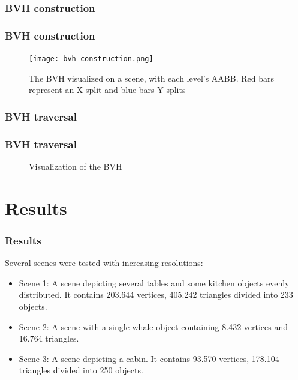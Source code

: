 \documentclass{beamer}
\newenvironment{figure*}%
{\begin{figure}}
{\end{figure}}
\begin{document}
\subsubsection{BVH construction}
\begin{frame}
  \frametitle{BVH construction}
\begin{figure}
\centering
\texttt{[image: bvh-construction.png]}
\caption{The BVH visualized on a scene, with each level's AABB. Red
  bars represent an X split and blue bars Y splits}
\label{fig:bvh-construction}
\end{figure}

\end{frame}


\subsubsection{BVH traversal}
\begin{frame}
  \frametitle{BVH traversal}
\begin{figure}
\centering


\caption{Visualization of the BVH}
\label{fig:bvh}
\end{figure}

\end{frame}



\section{Results}
\begin{frame}
  \frametitle{Results}

Several scenes were tested with increasing resolutions:
\begin{itemize}
\item Scene 1: A scene depicting several tables and some kitchen
  objects evenly distributed. It contains 203.644 vertices, 405.242
  triangles divided into 233 objects.
\item Scene 2: A scene with a single whale object containing 8.432
  vertices and 16.764 triangles.
\item Scene 3: A scene depicting a cabin. It contains 93.570 vertices,
  178.104 triangles divided into 250 objects.
\end{itemize}
\end{frame}
\end{document}
